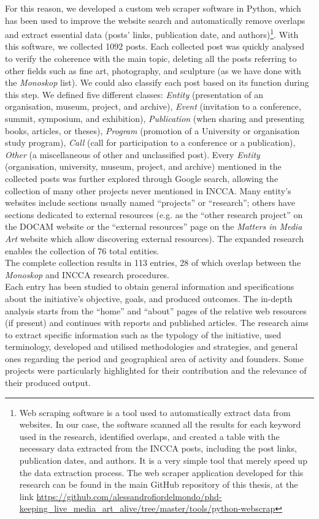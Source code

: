 For this reason, we developed a custom web scraper software in Python, which has been used to improve the website search and automatically remove overlaps and extract essential data (posts’ links, publication date, and authors)\footnote{Web scraping software is a tool used to automatically extract data from websites. In our case, the software scanned all the results for each keyword used in the research, identified overlaps, and created a table with the necessary data extracted from the INCCA posts, including the post links, publication dates, and authors. It is a very simple tool that merely speed up the data extraction process. The web scraper application developed for this research can be found in the main GitHub repository of this thesis, at the link \url{https://github.com/alessandrofiordelmondo/phd-keeping_live_media_art_alive/tree/master/tools/python-webscrap}}. With this software, we collected 1092 posts. Each collected post was quickly analysed to verify the coherence with the main topic, deleting all the posts referring to other fields such as fine art, photography, and sculpture (as we have done with the \textit{Monoskop} list). We could also classify each post based on its function during this step. We defined five different classes: \textit{Entity} (presentation of an organisation, museum, project, and archive), \textit{Event} (invitation to a conference, summit, symposium, and exhibition), \textit{Publication} (when sharing and presenting books, articles, or theses), \textit{Program} (promotion of a University or organisation study program), \textit{Call} (call for participation to a conference or a publication), \textit{Other} (a miscellaneous of other and unclassified post). Every \textit{Entity} (organisation, university, museum, project, and archive) mentioned in the collected posts was further explored through Google search, allowing the collection of many other projects never mentioned in INCCA. Many entity's websites include sections usually named ``projects'' or ``research''; others have sections dedicated to external resources (e.g. as the ``other research project'' on the DOCAM website or the ``external resources'' page on the \textit{Matters in Media Art} website which allow discovering external resources). The expanded research enables the collection of 76 total entities.\\
The complete collection results in 113 entries, 28 of which overlap between the \textit{Monoskop} and INCCA research procedures.\\
\newline
Each entry has been studied to obtain general information and specifications about the initiative’s objective, goals, and produced outcomes. The in-depth analysis starts from the ``home'' and ``about'' pages of the relative web resources (if present) and continues with reports and published articles. The research aims to extract specific information such as the typology of the initiative, used terminology, developed and utilised methodologies and strategies, and general ones regarding the period and geographical area of activity and founders. Some projects were particularly highlighted for their contribution and the relevance of their produced output.

